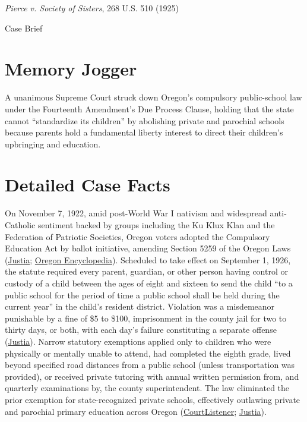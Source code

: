 \documentclass[12pt]{article}
\begin{document}
\begin{center}
{\LARGE \textit{Pierce v. Society of Sisters}, 268 U.S. 510 (1925)\par}
\vspace{0.8em}
{\large Case Brief\par}
\end{center}
\vspace{1em}

\section{Memory Jogger}
A unanimous Supreme Court struck down Oregon's compulsory public-school law under the Fourteenth Amendment's Due Process Clause, holding that the state cannot ``standardize its children'' by abolishing private and parochial schools because parents hold a fundamental liberty interest to direct their children's upbringing and education.

\section{Detailed Case Facts}
On November 7, 1922, amid post-World War I nativism and widespread anti-Catholic sentiment backed by groups including the Ku Klux Klan and the Federation of Patriotic Societies, Oregon voters adopted the Compulsory Education Act by ballot initiative, amending Section 5259 of the Oregon Laws (\href{https://supreme.justia.com/cases/federal/us/268/510/}{Justia}; \href{https://www.oregonencyclopedia.org/packets/1}{Oregon Encyclopedia}). Scheduled to take effect on September 1, 1926, the statute required every parent, guardian, or other person having control or custody of a child between the ages of eight and sixteen to send the child ``to a public school for the period of time a public school shall be held during the current year'' in the child's resident district. Violation was a misdemeanor punishable by a fine of \$5 to \$100, imprisonment in the county jail for two to thirty days, or both, with each day's failure constituting a separate offense (\href{https://supreme.justia.com/cases/federal/us/268/510/}{Justia}). Narrow statutory exemptions applied only to children who were physically or mentally unable to attend, had completed the eighth grade, lived beyond specified road distances from a public school (unless transportation was provided), or received private tutoring with annual written permission from, and quarterly examinations by, the county superintendent. The law eliminated the prior exemption for state-recognized private schools, effectively outlawing private and parochial primary education across Oregon (\href{https://www.courtlistener.com/opinion/100694/pierce-v-society-of-sisters/}{CourtListener}; \href{https://supreme.justia.com/cases/federal/us/268/510/}{Justia}).
\end{document}
